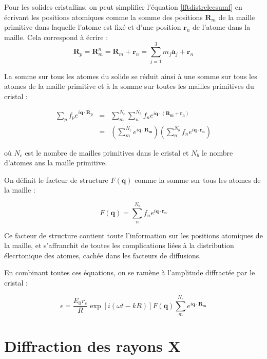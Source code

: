 Pour les solides cristallins, on peut simplifier l'équation
\ref{fftdistrelecsumf} en écrivant les positions atomiques comme la somme des
positions $\mathbf{R}_m$ de la maille primitive dans laquelle l'atome est fixé
et d'une position $\mathbf{r}_n$ de l'atome dans la maille. Cela correspond à
écrire :
\begin{equation}
    \mathbf{R}_p = \mathbf{R}_m^n = \mathbf{R}_m + \mathbf{r}_n =
    \sum_{j=1}^3 m_j \mathbf{a}_j + \mathbf{r}_n
\end{equation}

La somme sur tous les atomes du solide se réduit ainsi à une somme sur tous
les atomes de la maille primitive et à la somme sur toutes les mailles primitives
du cristal :

\begin{eqnarray}
    \sum_p f_p e^{i\mathbf{q \cdot R_p}} & = & \sum_m^{N_c} \sum_n^{N_b}
    f_n e^{i\mathbf{q\cdot(R_m + r_n)}}\\
    & = & \left( \sum_m^{N_c} e^{i\mathbf{q\cdot R_m}} \right)
    \left( \sum_n^{N_b} f_n e^{i\mathbf{q\cdot r_n}} \right)
\end{eqnarray}

où $N_c$ est le nombre de mailles primitives dans le cristal et $N_b$ le nombre
d'atomes ans la maille primitive.

On définit le facteur de structure $F(\mathbf{q})$ comme la somme sur tous les
atomes de la maille :

\begin{equation}
    F(\mathbf{q}) = \sum_n^{N_b} f_n e^{i \mathbf{q \cdot r_n}}
\end{equation}

Ce facteur de structure contient toute l'information sur les positions atomiques
de la maille, et s'affranchit de toutes les complications liées à la distribution
élecrtonique des atomes, cachée dans les facteurs de diffusions.

En combinant toutes ces équations, on se ramène à l'amplitude diffractée par le
cristal :

\begin{equation}
    \epsilon = \frac{E_0 r_e}{R} \exp[i(\omega t - k R)] F(\mathbf{q}) \sum_m^{N_c} e^{i\mathbf{q\cdot R_m}}
    \label{ampdiffract}
\end{equation}

\section{Diffraction des rayons X}

